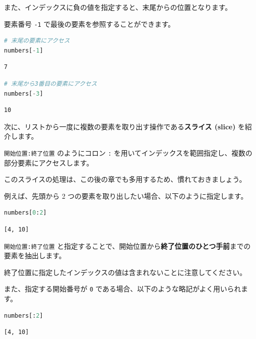 また、インデックスに負の値を指定すると、末尾からの位置となります。

要素番号 \texttt{-1} で最後の要素を参照することができます。


\begin{lstlisting}[style=codecell,language=Python]
# 末尾の要素にアクセス
numbers[-1]
\end{lstlisting}

\begin{lstlisting}[style=outputcell]
7
\end{lstlisting}

\begin{lstlisting}[style=codecell,language=Python]
# 末尾から3番目の要素にアクセス
numbers[-3]
\end{lstlisting}

\begin{lstlisting}[style=outputcell]
10
\end{lstlisting}

次に、リストから一度に複数の要素を取り出す操作である\textbf{スライス (slice)} を紹介します。

\texttt{開始位置:終了位置} のようにコロン \texttt{:} を用いてインデックスを範囲指定し、複数の部分要素にアクセスします。

このスライスの処理は、この後の章でも多用するため、慣れておきましょう。


例えば、先頭から 2 つの要素を取り出したい場合、以下のように指定します。


\begin{lstlisting}[style=codecell,language=Python]
numbers[0:2]
\end{lstlisting}

\begin{lstlisting}[style=outputcell]
[4, 10]
\end{lstlisting}

\texttt{開始位置:終了位置} と指定することで、開始位置から\textbf{終了位置のひとつ手前}までの要素を抽出します。

終了位置に指定したインデックスの値は含まれないことに注意してください。


また、指定する開始番号が \texttt{0} である場合、以下のような略記がよく用いられます。


\begin{lstlisting}[style=codecell,language=Python]
numbers[:2]
\end{lstlisting}

\begin{lstlisting}[style=outputcell]
[4, 10]
\end{lstlisting}

